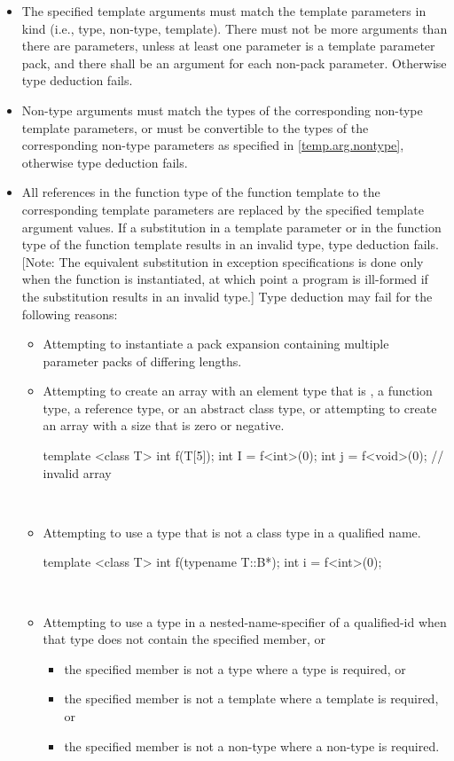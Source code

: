 \documentclass[american]{book}
\begin{document}
\begin{paras}
\begin{itemize}
\item
The specified template arguments must match the template parameters in
kind (i.e., type, non-type, template). There must not be more
arguments than there are parameters, unless at least one parameter is
a template parameter pack, and there shall be an argument for each
non-pack parameter. Otherwise type deduction fails.
\item
Non-type arguments must match the types of the corresponding non-type
template parameters, or must be convertible to the types of the
corresponding non-type parameters as specified in
\ref{temp.arg.nontype}, otherwise type deduction fails.
\item
All references in the function type  of the function template to the
corresponding template parameters are replaced by the specified
template argument values.  If a substitution in a template
parameter
or in the function type of the function template results in an invalid
type, type deduction fails.  [Note: The equivalent substitution in
exception specifications is done only when the function is
instantiated, at which point a program is ill-formed if the
substitution results in an invalid type.] Type deduction may fail for
the following reasons:

\begin{itemize}
\item
Attempting to instantiate a pack expansion containing
multiple parameter packs of differing lengths.

\item
Attempting to create an array with an element type that is , a
function type, a reference type, or an abstract class type, or attempting
to create an array with a size that is zero or negative.
\enterexample\ 

\begin{codeblock}
template <class T> int f(T[5]);
int I = f<int>(0);
int j = f<void>(0);             // invalid array
\end{codeblock}
\exitexample\ 
\item
Attempting to use a type that is not a class type in a qualified name.
\enterexample\ 

\begin{codeblock}
template <class T> int f(typename T::B*);
int i = f<int>(0);
\end{codeblock}
\exitexample\ 
\item
Attempting to use a type in a nested-name-specifier of a qualified-id when
that type does not contain the specified member, or
\begin{itemize}
\item
the specified member is not a type where a type is required, or
\item
the specified member is not a template where a template is required, or
\item
the specified member is not a non-type where a non-type is
required.
\end{itemize}
\enterexample\ 


\end{itemize}
\end{itemize}
\end{paras}
\end{document}
